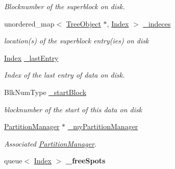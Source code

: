 \begin{DoxyCompactItemize}
\begin{DoxyCompactList}\small\item\em Blocknumber of the superblock on disk. \end{DoxyCompactList}\item 
unordered\+\_\+map$<$ \hyperlink{classTreeObject}{Tree\+Object} $\ast$, \hyperlink{structindex}{Index} $>$ \hyperlink{classTreeObject_ae79eb5bd12c820b50f5d10c3f9b5dc66}{\+\_\+indeces}\hypertarget{classTreeObject_ae79eb5bd12c820b50f5d10c3f9b5dc66}{}\label{classTreeObject_ae79eb5bd12c820b50f5d10c3f9b5dc66}

\begin{DoxyCompactList}\small\item\em location(s) of the superblock entry(ies) on disk \end{DoxyCompactList}\item 
\hyperlink{structindex}{Index} \hyperlink{classTreeObject_a1418b7078e9fbb06506a310ad9417c52}{\+\_\+last\+Entry}\hypertarget{classTreeObject_a1418b7078e9fbb06506a310ad9417c52}{}\label{classTreeObject_a1418b7078e9fbb06506a310ad9417c52}

\begin{DoxyCompactList}\small\item\em Index of the last entry of data on disk. \end{DoxyCompactList}\item 
Blk\+Num\+Type \hyperlink{classTreeObject_a5872ffdaa0c1a0cbf393da9a8a7657f3}{\+\_\+start\+Block}\hypertarget{classTreeObject_a5872ffdaa0c1a0cbf393da9a8a7657f3}{}\label{classTreeObject_a5872ffdaa0c1a0cbf393da9a8a7657f3}

\begin{DoxyCompactList}\small\item\em blocknumber of the start of this data on disk \end{DoxyCompactList}\item 
\hyperlink{classPartitionManager}{Partition\+Manager} $\ast$ \hyperlink{classTreeObject_a0b2ab130a5b95945bbd81250f667d63b}{\+\_\+my\+Partition\+Manager}\hypertarget{classTreeObject_a0b2ab130a5b95945bbd81250f667d63b}{}\label{classTreeObject_a0b2ab130a5b95945bbd81250f667d63b}

\begin{DoxyCompactList}\small\item\em Associated \hyperlink{classPartitionManager}{Partition\+Manager}. \end{DoxyCompactList}\item 
queue$<$ \hyperlink{structindex}{Index} $>$ {\bfseries \+\_\+free\+Spots}\hypertarget{classTreeObject_a43defc5d87c903cdc3e36edc3323ef87}{}\label{classTreeObject_a43defc5d87c903cdc3e36edc3323ef87}

\end{DoxyCompactItemize}


